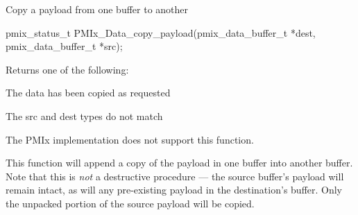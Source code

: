 Copy a payload from one buffer to another

\format

\cspecificstart
\begin{codepar}
pmix_status_t
PMIx_Data_copy_payload(pmix_data_buffer_t *dest,
                       pmix_data_buffer_t *src);
\end{codepar}
\cspecificend

\begin{arglist}
\end{arglist}

Returns one of the following:
\begin{constantdesc}
\item {} The data has been copied as requested
\item {} The src and dest  types do not match
\item {} The \ac{PMIx} implementation does not support this function.
\end{constantdesc}

\descr

This function will append a copy of the payload in one buffer into another buffer. Note that this is \textit{not} a destructive procedure --- the source buffer's payload will remain intact, as will any pre-existing payload in the destination's buffer. Only the unpacked portion of the source payload will be copied.


